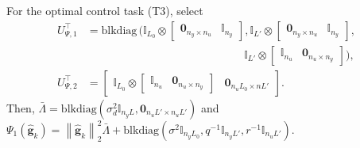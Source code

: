 \documentclass{ifacconf}
\newcommand{\norm}[1]{\left\lVert#1\right\rVert}
\newcommand{\blkdiag}[1]{\mathrm{blkdiag}\left(#1\right)}
\begin{document}
For the optimal control task (T3), select
\begin{align*}
    U_{\Psi,1}^\top&=\mathrm{blkdiag}\,\big(\mathbb{I}_{L_0}\otimes\begin{bmatrix}
        \mathbf{0}_{n_y\times n_u}&\mathbb{I}_{n_y}
    \end{bmatrix},\mathbb{I}_{L'}\otimes\begin{bmatrix}
        \mathbf{0}_{n_y\times n_u}&\mathbb{I}_{n_y}
    \end{bmatrix},\\
    &\qquad\qquad\qquad\qquad\qquad\qquad\qquad\,\mathbb{I}_{L'}\otimes\begin{bmatrix}
        \mathbb{I}_{n_u}&\mathbf{0}_{n_u\times n_y}
    \end{bmatrix}\big),\\
    U_{\Psi,2}^\top&=\begin{bmatrix}
    \mathbb{I}_{L_0}\otimes\begin{bmatrix}
        \mathbb{I}_{n_u}&\mathbf{0}_{n_u\times n_y}
    \end{bmatrix}&\mathbf{0}_{n_uL_0\times nL'}
    \end{bmatrix}.
\end{align*}
Then, $\bar{\Lambda}=\blkdiag{\sigma_d^2\mathbb{I}_{n_yL},\mathbf{0}_{n_uL'\times n_uL'}}$ and $\Psi_1(\hat{\mathbf{g}}_k)=\norm{\hat{\mathbf{g}}_k}_2^2\bar{\Lambda}+\blkdiag{\sigma^2\mathbb{I}_{n_yL_0},q^{-1}\mathbb{I}_{n_yL'},r^{-1}\mathbb{I}_{n_uL'}}$.
\end{document}

